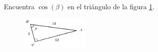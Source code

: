 \question[15] Encuentra $\cos(\beta)$ en el triángulo de la figura \ref{fig:functrig09}.
\begin{figure}[H]
    \begin{center}
        \includegraphics[width=0.3\textwidth]{../images/functrig09.png}
    \end{center}
    \caption{}
    \label{fig:functrig09}
\end{figure}
